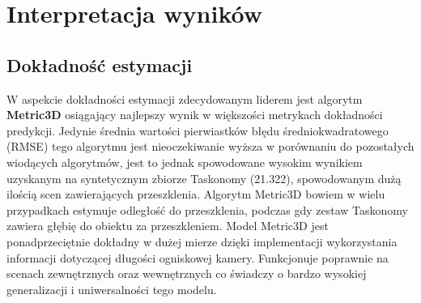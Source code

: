 \begin{table}[H]
    \centering
    \caption{Średnie wartości wyników uzyskanych przez algorytmy.}
    \vspace{0.1cm}
\label{table:metrics}
\end{table}

\section{Interpretacja wyników}
\subsection{Dokładność estymacji}
W aspekcie dokładności estymacji zdecydowanym liderem jest algorytm \textbf{Metric3D} osiągający najlepszy wynik w większości metrykach dokładności predykcji. Jedynie średnia wartości pierwiastków błędu średniokwadratowego (RMSE) tego algorytmu jest nieoczekiwanie wyższa w porównaniu do pozostałych wiodących algorytmów, jest to jednak spowodowane wysokim wynikiem uzyskanym na syntetycznym zbiorze Taskonomy (21.322), spowodowanym dużą ilością scen zawierających przeszklenia. Algorytm Metric3D bowiem w wielu przypadkach estymuje odległość do przeszklenia, podczas gdy zestaw Taskonomy zawiera głębię do obiektu za przeszkleniem. Model Metric3D jest ponadprzeciętnie dokładny w dużej mierze dzięki implementacji wykorzystania informacji dotyczącej długości ogniskowej kamery. Funkcjonuje poprawnie na scenach zewnętrznych oraz wewnętrznych co świadczy o bardzo wysokiej generalizacji i uniwersalności tego modelu.

